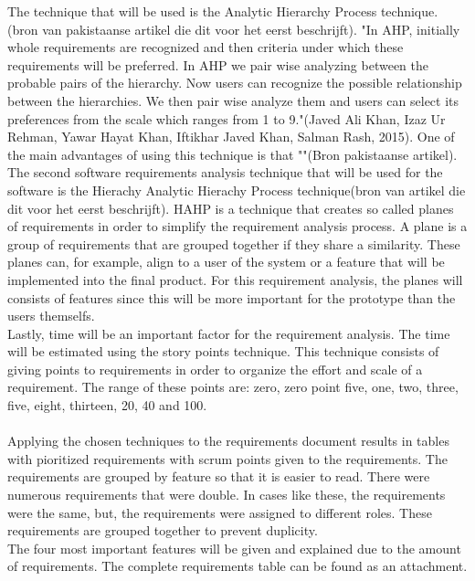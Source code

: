 \documentclass[paper=a4, fontsize=11pt,twoside]{scrartcl}	%
\begin{document}
The technique that will be used is the Analytic Hierarchy Process technique.(bron van pakistaanse artikel die dit voor het eerst beschrijft). "In AHP, initially whole requirements are recognized and then criteria under which these requirements will be preferred. In AHP we pair wise analyzing  between  the  probable  pairs  of  the  hierarchy. 
Now users can recognize the possible relationship between 
the hierarchies. We then pair wise analyze them and users can select its preferences from the scale which ranges from 
1 to 9."(Javed Ali Khan, Izaz Ur Rehman, Yawar Hayat Khan, Iftikhar Javed Khan, Salman Rash, 2015). One of the main advantages of using this technique is that ""(Bron pakistaanse artikel). The second software requirements analysis technique that will be used for the software is the Hierachy Analytic Hierachy Process technique(bron van artikel die dit voor het eerst beschrijft). HAHP is a technique that creates so called planes of requirements in order to simplify the requirement analysis process. A plane is a group of requirements that are grouped together if they share a similarity. These planes can, for example, align to a user of the system or a feature that will be implemented into the final product. For this requirement analysis, the planes will consists of features since this will be more important for the prototype than the users themselfs. \\
Lastly, time will be an important factor for the requirement analysis. The time will be estimated using the story points technique. This technique consists of giving  points to requirements in order to organize the effort and scale of a requirement. The range of these points are:  zero, zero point five, one, two, three, five, eight, thirteen, 20, 40 and 100. \\ \\
Applying the chosen techniques to the requirements document results in tables with pioritized requirements with scrum points given to the requirements. The requirements are grouped by feature so that it is easier to read. There were numerous requirements that were double. In cases like these, the requirements were the same, but, the requirements were assigned to different roles. These requirements are grouped together to prevent duplicity. \\
The four most important features will be given and explained due to the amount of requirements. The complete requirements table can be found as an attachment.\\
\end{document}
